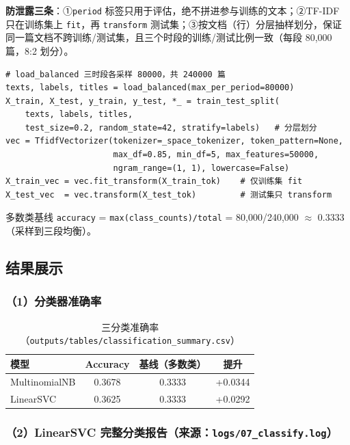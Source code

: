 \documentclass[12pt,a4paper]{article}
\begin{document}
\textbf{防泄露三条}：①\texttt{period} 标签只用于评估，绝不拼进参与训练的文本；②TF-IDF 只在训练集上 \texttt{fit}，再 \texttt{transform} 测试集；③按文档（行）分层抽样划分，保证同一篇文档不跨训练/测试集，且三个时段的训练/测试比例一致（每段 80,000 篇，8:2 划分）。

\begin{lstlisting}
# load_balanced 三时段各采样 80000，共 240000 篇
texts, labels, titles = load_balanced(max_per_period=80000)
X_train, X_test, y_train, y_test, *_ = train_test_split(
    texts, labels, titles,
    test_size=0.2, random_state=42, stratify=labels)   # 分层划分
vec = TfidfVectorizer(tokenizer=_space_tokenizer, token_pattern=None,
                      max_df=0.85, min_df=5, max_features=50000,
                      ngram_range=(1, 1), lowercase=False)
X_train_vec = vec.fit_transform(X_train_tok)    # 仅训练集 fit
X_test_vec  = vec.transform(X_test_tok)         # 测试集只 transform
\end{lstlisting}

多数类基线 \texttt{accuracy} = \texttt{max(class\_counts)/total} = 80,000/240,000 $\approx$ 0.3333（采样到三段均衡）。

\subsection{结果展示}

\subsubsection*{（1）分类器准确率}

\begin{table}[H]
\centering
\caption{三分类准确率（\texttt{outputs/tables/classification\_summary.csv}）}
\renewcommand{\arraystretch}{1.25}
\begin{tabular}{|l|c|c|c|}
\hline
\textbf{模型} & \textbf{Accuracy} & \textbf{基线（多数类）} & \textbf{提升} \\
\hline
MultinomialNB & 0.3678 & 0.3333 & +0.0344 \\
\hline LinearSVC  & 0.3625 & 0.3333 & +0.0292 \\
\hline
\end{tabular}
\end{table}

\subsubsection*{（2）LinearSVC 完整分类报告（来源：\texttt{logs/07\_classify.log}）}
\end{document}
